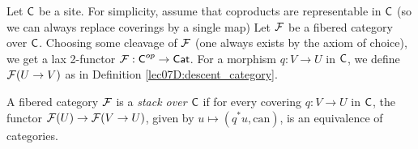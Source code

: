 
 Let $\text{\sf C}$ be a site. For simplicity, assume that coproducts are representable in $\text{\sf C}$ (so
 we can always replace coverings by a single map)  Let $\mathcal{F}$ be a fibered
 category over $\text{\sf C}$. Choosing some cleavage of $\mathcal{F}$ (one always exists by the axiom of
 choice), we get a lax 2-functor $\mathcal{F}:\text{\sf C}^{op}\to \text{\sf Cat}$. For a morphism $q:V\to U$ in
 $\text{\sf C}$, we define $\mathcal{F}(U\to V)$ as in Definition \ref{lec07D:descent_category}.
 \begin{definition}
   A fibered category $\mathcal{F}$ is a \emph{stack over $\text{\sf C}$} if for every covering $q:V\to U$
   in $\text{\sf C}$, the functor $\mathcal{F}(U)\to \mathcal{F}(V\to U)$, given by $u\mapsto (q^*u,\textrm{can})$,
   is an equivalence of categories.
 \end{definition}
